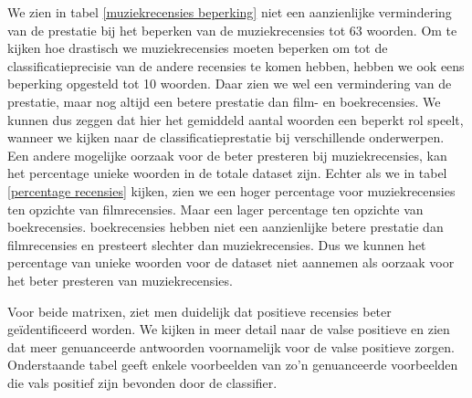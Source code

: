 We zien in tabel \ref{muziekrecensies beperking} niet een aanzienlijke vermindering van de prestatie bij het beperken van de muziekrecensies tot 63 woorden. Om te kijken hoe drastisch we muziekrecensies moeten beperken om tot de classificatieprecisie van de andere recensies te komen hebben, hebben we ook eens beperking opgesteld tot 10 woorden. Daar zien we wel een vermindering van de prestatie, maar nog altijd een betere prestatie dan film- en boekrecensies. We kunnen dus zeggen dat hier het gemiddeld aantal woorden een beperkt rol speelt, wanneer we kijken naar de classificatieprestatie bij verschillende onderwerpen.\\

Een andere mogelijke oorzaak voor de beter presteren bij muziekrecensies, kan het percentage unieke woorden in de totale dataset zijn. Echter als we in tabel \ref{percentage recensies} kijken, zien we een hoger percentage voor muziekrecensies ten opzichte van filmrecensies. Maar een lager percentage ten opzichte van boekrecensies. boekrecensies hebben niet een aanzienlijke betere prestatie dan filmrecensies en presteert slechter dan muziekrecensies. Dus we kunnen het percentage van unieke woorden voor de dataset niet aannemen als oorzaak voor het beter presteren van muziekrecensies. 

Voor beide matrixen, ziet men duidelijk dat positieve recensies beter ge\"identificeerd worden. We kijken in meer detail naar de valse positieve en zien dat meer genuanceerde antwoorden voornamelijk voor de valse positieve zorgen. Onderstaande tabel geeft enkele voorbeelden van zo'n genuanceerde voorbeelden die vals positief zijn bevonden door de classifier.

